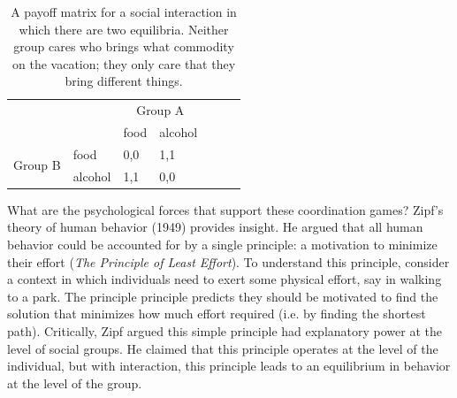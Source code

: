 \documentclass[man, noapacite, 12pt]{apa2}
\begin{document}
\begin{table}[t]
\begin{center}
\begin{tabular}{l p{3cm} l p{3cm} l p{3cm} l}
 &  & \multicolumn{2}{c}{Group A} \\ \cline{2-4} 
\multicolumn{1}{l|}{} & \multicolumn{1}{l|}{} & \multicolumn{1}{l|}{food} & \multicolumn{1}{l|}{alcohol} \\ \cline{2-4} 
\multicolumn{1}{c|}{\multirow{2}{*}{Group B}} & \multicolumn{1}{l|}{food} & \multicolumn{1}{l|}{0,0} & \multicolumn{1}{l|}{1,1} \\ \cline{2-4} 
\multicolumn{1}{c|}{} & \multicolumn{1}{l|}{alcohol} & \multicolumn{1}{l|}{1,1} & \multicolumn{1}{l|}{0,0} \\ \cline{2-4} 
\end{tabular}
\caption{A payoff matrix for a social interaction in which there are two equilibria. Neither group cares who brings what commodity on the vacation; they only care that they bring different things. }
\end{center}
\end{table}

What are the psychological forces that support these coordination games? Zipf's theory of human behavior (1949) provides  insight. He argued that all human behavior could be accounted for by a single principle: a motivation to minimize their effort ({\it The Principle of Least Effort}). To understand this principle, consider a context in which individuals need to exert some physical effort, say in walking to a park. The principle principle predicts they should be motivated to find the solution that minimizes how much effort required (i.e. by finding the shortest path). Critically, Zipf argued this simple principle had explanatory power at the level of social groups. He claimed that this principle operates at the level of the individual, but with interaction, this principle leads to an equilibrium in behavior at the level of the group.
\end{document}
